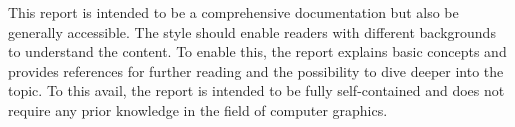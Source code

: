 
This report is intended to be a comprehensive documentation but also be generally accessible. The style should enable readers with different backgrounds to understand the content. To enable this, the report explains basic concepts and provides references for further reading and the possibility to dive deeper into the topic. To this avail, the report is intended to be fully self-contained and does not require any prior knowledge in the field of computer graphics.
